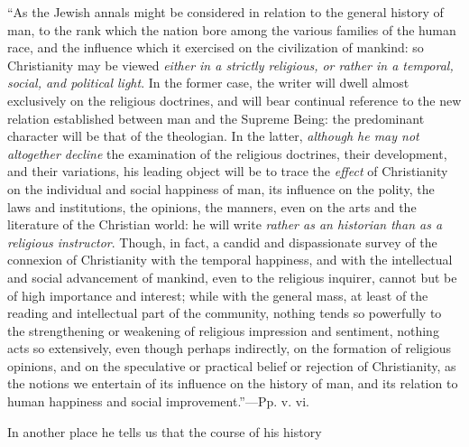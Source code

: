 ``As
the Jewish annals might be considered in relation to the general
history of man, to the rank which the nation bore among the various
families of the human race, and the influence which it exercised on
the civilization of mankind: so Christianity may be viewed \emph{either
in a strictly religious, or rather in a temporal, social, and
political light}. In the former case, the writer will dwell almost
exclusively on the religious doctrines, and will bear continual
reference to the new relation established between man and the Supreme
Being: the predominant character will be that of the theologian. In
the latter, \emph{although he may not altogether decline} the
examination of the religious doctrines, their development, and their
variations, his leading object will be to trace the \emph{effect} of
Christianity on the individual and social happiness of man, its
influence on the polity, the laws and institutions, the opinions, the
manners, even on the arts and the literature of the Christian world:
he will write \emph{rather as an historian than as a religious instructor}.
Though, in fact, a candid and dispassionate survey of the connexion of
Christianity with the temporal happiness, and with the intellectual
and social advancement of mankind, even to the religious inquirer,
cannot but be of high importance and interest; while with the general
mass, at least of the reading and intellectual part of the community,
nothing tends so powerfully to the strengthening or weakening of
religious impression and sentiment, nothing acts so extensively, even
though perhaps indirectly, on the formation of religious opinions, and
on the speculative or practical belief or rejection of Christianity,
as the notions we entertain of its influence on the history of man,
and its relation to human happiness and social improvement.''—Pp. v.
vi.

In another place he tells us that the course of
his history

